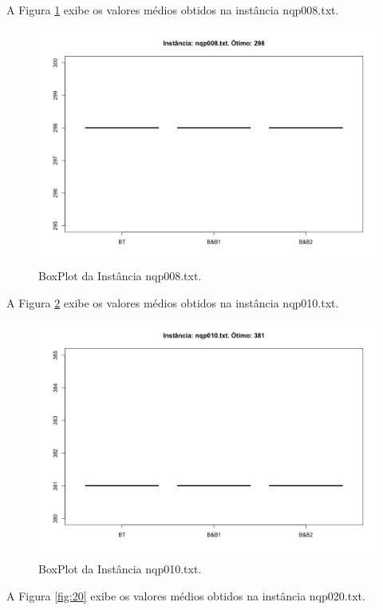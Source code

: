 \documentclass[12pt]{article}
\begin{document}
	A Figura \ref{fig:8} exibe os valores médios obtidos na instância nqp008.txt.

	\begin{figure}[H]
		\centering
		\includegraphics[width=0.9\linewidth]{img/8}
		\caption{BoxPlot da Instância nqp008.txt.}
		\label{fig:8}
	\end{figure}

	A Figura \ref{fig:10} exibe os valores médios obtidos na instância nqp010.txt.

	\begin{figure}[H]
		\centering
		\includegraphics[width=0.9\linewidth]{img/10}
		\caption{BoxPlot da Instância nqp010.txt.}
		\label{fig:10}
	\end{figure}

	A Figura \ref{fig:20} exibe os valores médios obtidos na instância nqp020.txt.
\end{document}
